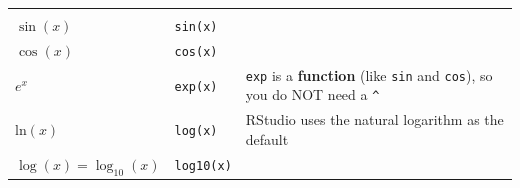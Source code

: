\documentclass[
]{book}
\begin{document}
\begin{longtable}[]{@{}lll@{}}
\begin{minipage}[t]{0.30\columnwidth}
\strut
\end{minipage}\tabularnewline
\begin{minipage}[t]{0.30\columnwidth}\raggedright
\(\sin(x)\)\strut
\end{minipage} & \begin{minipage}[t]{0.30\columnwidth}\raggedright
\texttt{sin(x)}\strut
\end{minipage} & \begin{minipage}[t]{0.30\columnwidth}\raggedright
\strut
\end{minipage}\tabularnewline
\begin{minipage}[t]{0.30\columnwidth}\raggedright
\(\cos(x)\)\strut
\end{minipage} & \begin{minipage}[t]{0.30\columnwidth}\raggedright
\texttt{cos(x)}\strut
\end{minipage} & \begin{minipage}[t]{0.30\columnwidth}\raggedright
\strut
\end{minipage}\tabularnewline
\begin{minipage}[t]{0.30\columnwidth}\raggedright
\(e^x\)\strut
\end{minipage} & \begin{minipage}[t]{0.30\columnwidth}\raggedright
\texttt{exp(x)}\strut
\end{minipage} & \begin{minipage}[t]{0.30\columnwidth}\raggedright
\texttt{exp} is a \textbf{function} (like \texttt{sin} and \texttt{cos}), so you do NOT need a \texttt{\^{}}\strut
\end{minipage}\tabularnewline
\begin{minipage}[t]{0.30\columnwidth}\raggedright
\(\mbox{ln}(x)\)\strut
\end{minipage} & \begin{minipage}[t]{0.30\columnwidth}\raggedright
\texttt{log(x)}\strut
\end{minipage} & \begin{minipage}[t]{0.30\columnwidth}\raggedright
RStudio uses the natural logarithm as the default\strut
\end{minipage}\tabularnewline
\begin{minipage}[t]{0.30\columnwidth}\raggedright
\(\log(x) = \log_{10}(x)\)\strut
\end{minipage} & \begin{minipage}[t]{0.30\columnwidth}\raggedright
\texttt{log10(x)}\strut
\end{minipage} & \begin{minipage}[t]{0.30\columnwidth}\raggedright

\end{minipage}
\end{longtable}
\end{document}
